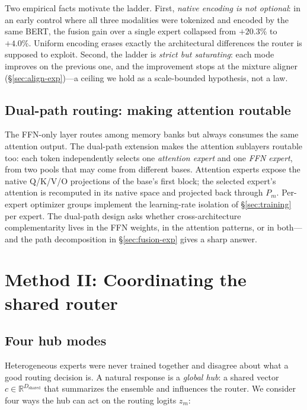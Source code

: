 \documentclass[10pt,twoside]{article}
\newcommand{\R}{\mathbb{R}}
\theoremstyle{definition}
\theoremstyle{plain}
\theoremstyle{remark}
\begin{document}
Two empirical facts motivate the ladder. First, \emph{native encoding is not optional}: in an early control where all three modalities were tokenized and encoded by the same BERT, the fusion gain over a single expert collapsed from $+20.3\%$ to $+4.0\%$. Uniform encoding erases exactly the architectural differences the router is supposed to exploit. Second, the ladder is \emph{strict but saturating}: each mode improves on the previous one, and the improvement stops at the mixture aligner (\S\ref{sec:align-exp})---a ceiling we hold as a scale-bounded hypothesis, not a law.

\subsection{Dual-path routing: making attention routable}
\label{sec:dualpath}

The FFN-only layer routes among memory banks but always consumes the same attention output. The dual-path extension makes the attention sublayers routable too: each token independently selects one \emph{attention expert} and one \emph{FFN expert}, from two pools that may come from different bases. Attention experts expose the native Q/K/V/O projections of the base's first block; the selected expert's attention is recomputed in its native space and projected back through $P_m$. Per-expert optimizer groups implement the learning-rate isolation of \S\ref{sec:training} per expert. The dual-path design asks whether cross-architecture complementarity lives in the FFN weights, in the attention patterns, or in both---and the path decomposition in \S\ref{sec:fusion-exp} gives a sharp answer.

\section{Method II: Coordinating the shared router}
\label{sec:hub}

\subsection{Four hub modes}
\label{sec:modes}

Heterogeneous experts were never trained together and disagree about what a good routing decision is. A natural response is a \emph{global hub}: a shared vector $c \in \R^{D_{\text{shared}}}$ that summarizes the ensemble and influences the router. We consider four ways the hub can act on the routing logits $z_m$:
\end{document}
